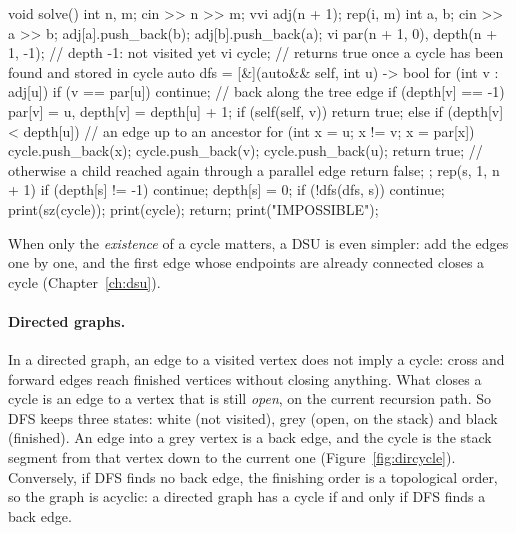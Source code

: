 \begin{code}
void solve() {
    int n, m;
    cin >> n >> m;
    vvi adj(n + 1);
    rep(i, m) {
        int a, b;
        cin >> a >> b;
        adj[a].push_back(b);
        adj[b].push_back(a);
    }
    vi par(n + 1, 0), depth(n + 1, -1);  // depth -1: not visited yet
    vi cycle;
    // returns true once a cycle has been found and stored in cycle
    auto dfs = [&](auto&& self, int u) -> bool {
        for (int v : adj[u]) {
            if (v == par[u]) continue;  // back along the tree edge
            if (depth[v] == -1) {
                par[v] = u, depth[v] = depth[u] + 1;
                if (self(self, v)) return true;
            } else if (depth[v] < depth[u]) {  // an edge up to an ancestor
                for (int x = u; x != v; x = par[x]) cycle.push_back(x);
                cycle.push_back(v);
                cycle.push_back(u);
                return true;
            }  // otherwise a child reached again through a parallel edge
        }
        return false;
    };
    rep(s, 1, n + 1) {
        if (depth[s] != -1) continue;
        depth[s] = 0;
        if (!dfs(dfs, s)) continue;
        print(sz(cycle));
        print(cycle);
        return;
    }
    print("IMPOSSIBLE");
}
\end{code}

When only the \emph{existence} of a cycle matters, a DSU is even simpler: add the edges one by one, and the first edge whose
endpoints are already connected closes a cycle (Chapter~\ref{ch:dsu}).

\paragraph{Directed graphs.} In a directed graph, an edge to a visited vertex does not imply a cycle: cross and forward edges
reach finished vertices without closing anything. What closes a cycle is an edge to a vertex that is still \emph{open}, on the
current recursion path. So DFS keeps three states: white (not visited), grey (open, on the stack) and black (finished). An
edge into a grey vertex is a back edge, and the cycle is the stack segment from that vertex down to the current one
(Figure~\ref{fig:dircycle}). Conversely, if DFS finds no back edge, the finishing order is a topological order, so the graph is
acyclic: a directed graph has a cycle if and only if DFS finds a back edge.

